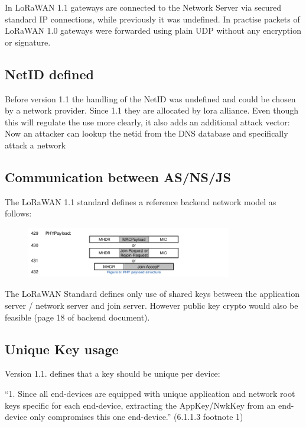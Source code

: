 {In LoRaWAN 1.1 gateways are connected to the Network Server via secured
standard IP connections, while previously it was undefined. In practise
packets of LoRaWAN 1.0 gateways were forwarded using plain UDP without
any encryption or signature.}

\hypertarget{h.jom2i6adwnnm}{\subsection{\texorpdfstring{{NetID
defined}}{NetID defined}}\label{h.jom2i6adwnnm}}

{Before version 1.1 the handling of the NetID was undefined and could be
chosen by a network provider. Since 1.1 they are allocated by lora
alliance. Even though this will regulate the use more clearly, it also
adds an additional attack vector: Now an attacker can lookup the netid
from the DNS database and specifically attack a network}

\hypertarget{h.rext4wcd7qnn}{\subsection{\texorpdfstring{{Communication
between
AS/NS/JS}}{Communication between AS/NS/JS}}\label{h.rext4wcd7qnn}}

{The LoRaWAN 1.1 standard defines a reference backend network model as
follows:}
\begin{figure}[h!]
{\includegraphics[width=0.8\textwidth]{images/image10.png}}
\end{figure}

{The LoRaWAN Standard defines only use of shared keys between the
application server / network server and join server. However public key
crypto would also be feasible (page 18 of backend document).}

\hypertarget{h.rxbla8bfpdr7}{\subsection{\texorpdfstring{{Unique Key
usage}}{Unique Key usage}}\label{h.rxbla8bfpdr7}}

{Version 1.1. defines that a key should be unique per device: }

{``1. Since all end-devices are equipped with unique application and
network root keys specific for each end-device, extracting the
AppKey/NwkKey from an end-device only compromises this one end-device.''
(6.1.1.3 footnote 1)}


